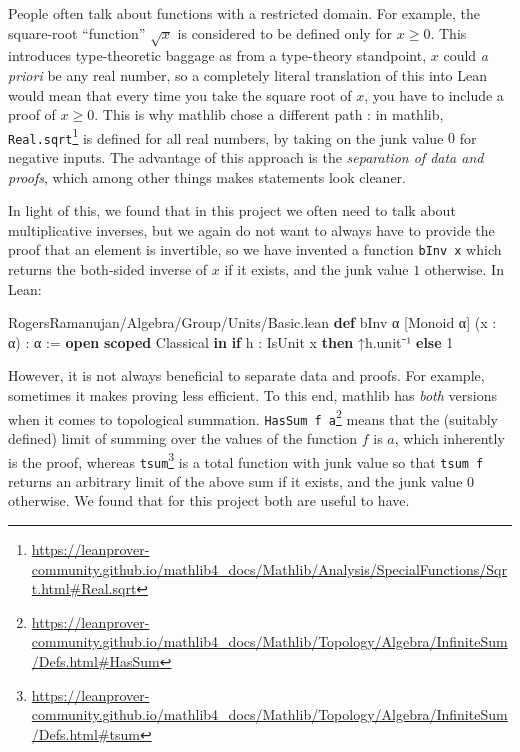 \documentclass[12pt]{amsart}
\theoremstyle{definition}
\theoremstyle{remark}
\numberwithin{equation}{subsection}
\newcommand{\kw}[1]{\textcolor{keywordcolor}{\textbf{#1}}}
\newcommand{\var}[1]{\textcolor{tacticcolor}{#1}}
\newcommand{\prop}[1]{\textcolor{sortcolor}{#1}}
\newcommand{\num}[1]{\textcolor{numcolor}{#1}}
\newcommand{\imp}[1]{\textcolor{commentcolor}{\textbraceleft#1\textbraceright}}
\begin{document}
People often talk about functions with a restricted domain. For example, the square-root ``function'' $\sqrt{x}$ is considered to be defined only for $x \ge 0$. This introduces type-theoretic baggage as from a type-theory standpoint, $x$ could \textit{a priori} be any real number, so a completely literal translation of this into Lean would mean that every time you take the square root of $x$, you have to include a proof of $x \ge 0$. This is why mathlib chose a different path \cite{Buzzard2020}: in mathlib, \texttt{Real.sqrt}\footnote{\url{https://leanprover-community.github.io/mathlib4_docs/Mathlib/Analysis/SpecialFunctions/Sqrt.html\#Real.sqrt}} is defined for all real numbers, by taking on the junk value $0$ for negative inputs. The advantage of this approach is the \textit{separation of data and proofs}, which among other things makes statements look cleaner.

In light of this, we found that in this project we often need to talk about multiplicative inverses, but we again do not want to always have to provide the proof that an element is invertible, so we have invented a function \texttt{bInv x} which returns the both-sided inverse of $x$ if it exists, and the junk value $1$ otherwise. In Lean:

\begin{code}{RogersRamanujan/Algebra/Group/Units/Basic.lean}
\kw{def} bInv \imp{α} [Monoid \var{α}] (\var{x} : \var{α}) : \var{α} :=
  \kw{open} \kw{scoped} Classical \kw{in} \kw{if} \var{h} : IsUnit \var{x} \kw{then} ↑\var{h}.\prop{unit}⁻¹ \kw{else} \num{1}
\end{code}

However, it is not always beneficial to separate data and proofs. For example, sometimes it makes proving less efficient. To this end, mathlib has \textit{both} versions when it comes to topological summation. \texttt{HasSum f a}\footnote{\url{https://leanprover-community.github.io/mathlib4_docs/Mathlib/Topology/Algebra/InfiniteSum/Defs.html\#HasSum}} means that the (suitably defined) limit of summing over the values of the function $f$ is $a$, which inherently is the proof, whereas \texttt{tsum}\footnote{\url{https://leanprover-community.github.io/mathlib4_docs/Mathlib/Topology/Algebra/InfiniteSum/Defs.html\#tsum}} is a total function with junk value so that \texttt{tsum f} returns an arbitrary limit of the above sum if it exists, and the junk value $0$ otherwise. We found that for this project both are useful to have.
\end{document}
